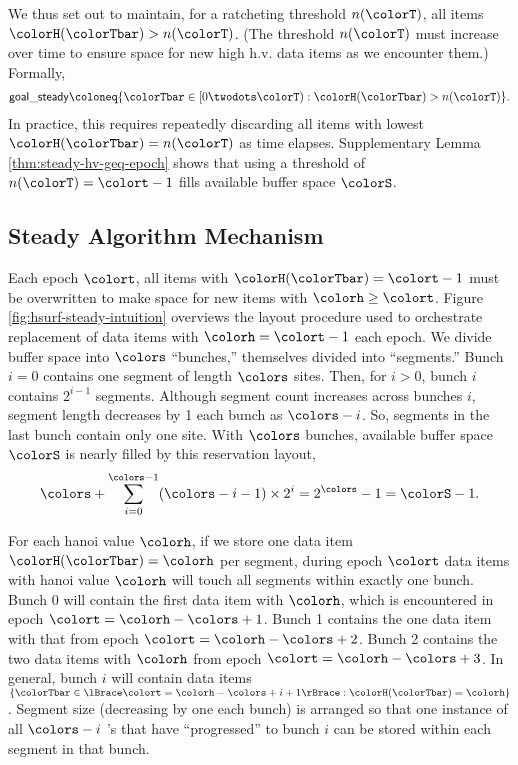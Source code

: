 We thus set out to maintain, for a ratcheting threshold $n(\colorT)$, all items $\colorH(\colorTbar) > n(\colorT)$.
(The threshold $n(\colorT)$ must increase over time to ensure space for new high h.v. data items as we encounter them.)
Formally,
\begin{align*}
\mathsf{goal\_steady}
\coloneq \{
\colorTbar \in [0 \twodots \colorT)
: \colorH(\colorTbar) > n(\colorT)
\}.
\end{align*}
In practice, this requires repeatedly discarding all items with lowest \hv{} $\colorH(\colorTbar) = n(\colorT)$ as time elapses.
Supplementary Lemma \ref{thm:steady-hv-geq-epoch} shows that using a threshold of $n(\colorT) = \colort - 1$ fills available buffer space $\colorS$.%

\subsection{Steady Algorithm Mechanism}
\label{sec:steady-mechanism}



Each epoch $\colort$, all items with $\colorH(\colorTbar) = \colort - 1$ must be overwritten to make space for new items with \hv{} $\colorh \geq \colort$.
Figure \ref{fig:hsurf-steady-intuition} overviews the layout procedure used to orchestrate replacement of data items with \hv{} $\colorh = \colort - 1$ each epoch.
We divide buffer space into $\colors$ ``bunches,'' themselves divided into ``segments.''
Bunch $i=0$ contains one segment of length $\colors$ sites.
Then, for $i > 0$, bunch $i$ contains $2^{i-1}$ segments.
Although segment count increases across bunches $i$, segment length decreases by 1 each bunch as $\colors - i$.
So, segments in the last bunch contain only one site.
With $\colors$ bunches, available buffer space $\colorS$ is nearly filled by this reservation layout,
\begin{align*}
\colors + \sum_{i=0}^{\colors-1} (\colors - i - 1) \times 2^{i} = 2^{\colors} - 1 = \colorS - 1.
\end{align*}

For each hanoi value $\colorh$, if we store one data item $\colorH(\colorTbar) = \colorh$ per segment, during epoch $\colort$ data items with hanoi value $\colorh$ will touch all segments within exactly one bunch.
Bunch 0 will contain the first data item with \hv{} $\colorh$, which is encountered in epoch $\colort=\colorh - \colors + 1$.
Bunch 1 contains the one data item with that \hv{} from epoch $\colort=\colorh - \colors + 2$.
Bunch 2 contains the two data items with \hv{} $\colorh$ from epoch $\colort=\colorh - \colors + 3$.
In general, bunch $i$ will contain data items $\{ \colorTbar \in \lBrace \colort = \colorh - \colors + i + 1 \rBrace : \colorH(\colorTbar) = \colorh \}$.
Segment size (decreasing by one each bunch) is arranged so that one instance of all $\colors - i$ \hv's that have ``progressed'' to bunch $i$ can be stored within each segment in that bunch.


